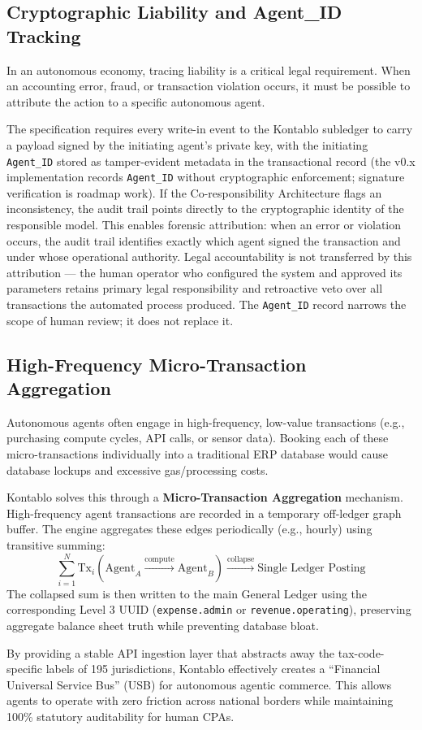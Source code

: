 \subsection{Cryptographic Liability and Agent\_ID Tracking}
In an autonomous economy, tracing liability is a critical legal requirement. When an accounting error, fraud, or transaction violation occurs, it must be possible to attribute the action to a specific autonomous agent.

The specification requires every write-in event to the Kontablo subledger to carry a payload signed by the initiating agent's private key, with the initiating \texttt{Agent\_ID} stored as tamper-evident metadata in the transactional record (the v0.x implementation records \texttt{Agent\_ID} without cryptographic enforcement; signature verification is roadmap work). If the Co-responsibility Architecture flags an inconsistency, the audit trail points directly to the cryptographic identity of the responsible model. This enables forensic attribution: when an error or violation occurs, the audit trail identifies exactly which agent signed the transaction and under whose operational authority. Legal accountability is not transferred by this attribution --- the human operator who configured the system and approved its parameters retains primary legal responsibility and retroactive veto over all transactions the automated process produced. The \texttt{Agent\_ID} record narrows the scope of human review; it does not replace it.

\subsection{High-Frequency Micro-Transaction Aggregation}
Autonomous agents often engage in high-frequency, low-value transactions (e.g., purchasing compute cycles, API calls, or sensor data). Booking each of these micro-transactions individually into a traditional ERP database would cause database lockups and excessive gas/processing costs.

Kontablo solves this through a \textbf{Micro-Transaction Aggregation} mechanism. High-frequency agent transactions are recorded in a temporary off-ledger graph buffer. The engine aggregates these edges periodically (e.g., hourly) using transitive summing:
\[ \sum_{i=1}^{N} \text{Tx}_i(\text{Agent}_A \xrightarrow{\text{compute}} \text{Agent}_B) \xrightarrow{\text{collapse}} \text{Single Ledger Posting} \]
The collapsed sum is then written to the main General Ledger using the corresponding Level 3 UUID (\texttt{expense.admin} or \texttt{revenue.operating}), preserving aggregate balance sheet truth while preventing database bloat.

By providing a stable API ingestion layer that abstracts away the tax-code-specific labels of 195 jurisdictions, Kontablo effectively creates a ``Financial Universal Service Bus'' (USB) for autonomous agentic commerce. This allows agents to operate with zero friction across national borders while maintaining 100\% statutory auditability for human CPAs.
